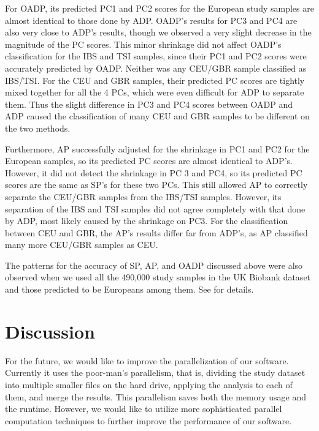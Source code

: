 \documentclass{article}
\begin{document}
For OADP, its predicted PC1 and PC2 scores
for the European study samples
are almost identical
to those done by ADP.
OADP's results for PC3 and PC4
are also very close to ADP's results,
though we observed a very slight decrease in the magnitude of the PC scores.
This minor shrinkage did not affect
OADP's classification for the IBS and TSI samples,
since their PC1 and PC2 scores were accurately predicted by OADP.
Neither was any CEU/GBR sample classified as IBS/TSI. 
For the CEU and GBR samples,
their predicted PC scores are tightly mixed together
for all the 4 PCs,
which were even difficult for ADP to separate them.
Thus the slight difference in PC3 and PC4 scores
between OADP and ADP
caused the classification of many CEU and GBR samples
to be different on the two methods.

Furthermore, AP successfully adjusted for the shrinkage
in PC1 and PC2 for the European samples,
so its predicted PC scores are almost identical to ADP's.
However, it did not detect the shrinkage in PC 3 and PC4,
so its predicted PC scores are the same as SP's for these two PCs.
This still allowed AP to correctly separate
the CEU/GBR samples from the IBS/TSI samples.
However, its separation of the IBS and TSI samples
did not agree completely with that done by ADP,
most likely caused by the shrinkage on PC3.
For the classification between CEU and GBR,
the AP's results differ far from ADP's,
as AP classified many more CEU/GBR samples as CEU.

The patterns for the accuracy of SP, AP, and OADP
discussed above
were also observed
when we used all the 490,000 study samples in the UK Biobank dataset
and those predicted to be Europeans among them.
See  for details.


\section{Discussion}

For the future, we would like
to improve the parallelization of our software.
Currently it uses the poor-man’s parallelism,
that is,
dividing the study dataset into multiple smaller files on the hard drive,
applying the analysis to each of them,
and merge the results.
This parallelism saves both the memory usage and the runtime.
However, we would like to utilize
more sophisticated parallel computation techniques
to further improve the performance of our software.

\newpage

\appendix
\end{document}
